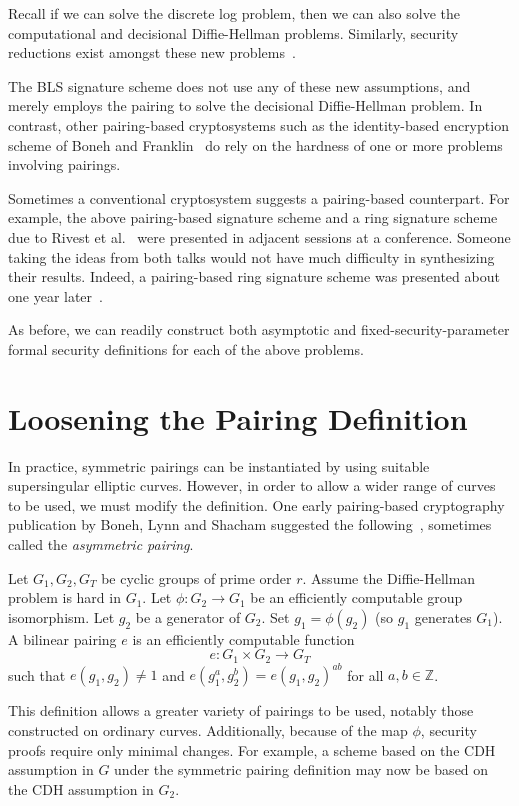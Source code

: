 Recall if we can solve the discrete log problem, then we can also solve
the computational and decisional Diffie-Hellman problems. Similarly,
security reductions exist amongst these new problems~\cite{jouxsurvey}.

The BLS signature scheme does not use any of these new assumptions, and merely
employs the pairing to solve the decisional Diffie-Hellman problem. In
contrast, other pairing-based cryptosystems such as the identity-based
encryption scheme of Boneh and Franklin~\cite{bf} do rely on the hardness of
one or more problems involving pairings.

Sometimes a conventional cryptosystem suggests a pairing-based counterpart. For
example, the above pairing-based signature scheme and a ring signature scheme
due to Rivest et al.~\cite{rst} were presented in adjacent sessions at a
conference. Someone taking the ideas from both talks would not have much
difficulty in synthesizing their results. Indeed, a pairing-based ring
signature scheme was presented about one year later~\cite{bgls}.

As before, we can readily construct both asymptotic and
fixed-security-parameter formal security definitions for each of the above
problems.

\section{\label{sec:asymmetricpairing}Loosening the Pairing Definition}

In practice, symmetric pairings can be instantiated by using suitable
supersingular elliptic curves. However, in order to allow a wider range of
curves to be used, we must modify the definition. One early pairing-based
cryptography publication by Boneh, Lynn and Shacham suggested the
following~\cite{bls}, sometimes called the \emph{asymmetric pairing}.

Let $G_1, G_2, G_T$ be cyclic groups of prime order $r$.
Assume the Diffie-Hellman problem is hard in $G_1$.
Let $\phi : G_2 \rightarrow G_1$ be an efficiently computable group
isomorphism. Let $g_2$ be a generator of $G_2$.
Set $g_1 = \phi(g_2)$ (so $g_1$ generates $G_1$). 
A bilinear pairing $e$ is an efficiently computable function
\[
e:G_1 \times G_2 \rightarrow G_T
\]
such that $e(g_1,g_2) \ne 1$ and
$e(g_1^a, g_2^b) = e(g_1,g_2)^{a b}$ for all $a, b \in \mathbb{Z}$.

This definition allows a greater variety of pairings to be used,
notably those constructed on ordinary curves.
Additionally, because of the map $\phi$, security proofs
require only minimal changes. For example,
a scheme based on the CDH assumption in $G$ under
the symmetric pairing definition may now be based on the CDH assumption in
$G_2$.

